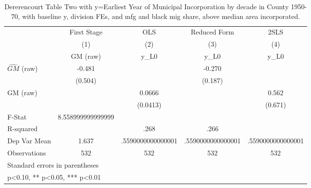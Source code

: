\begin{table}[htbp]\centering
\def\sym#1{\ifmmode^{#1}\else\(^{#1}\)\fi}
\caption{Dererencourt Table Two with y=Earliest Year of Municipal Incorporation by decade in County 1950-70, with baseline y, division FEs, and mfg and black mig share, above median area incorporated.}
\begin{tabular}{l*{4}{c}}
\toprule
                    & First Stage   &         OLS   &Reduced Form   &        2SLS   \\
                    &\multicolumn{1}{c}{(1)}&\multicolumn{1}{c}{(2)}&\multicolumn{1}{c}{(3)}&\multicolumn{1}{c}{(4)}\\
                    &\multicolumn{1}{c}{GM  (raw)}&\multicolumn{1}{c}{y\_L0}&\multicolumn{1}{c}{y\_L0}&\multicolumn{1}{c}{y\_L0}\\
\midrule
$\hat{GM}$ (raw)    &      -0.481   &               &      -0.270   &               \\
                    &     (0.504)   &               &     (0.187)   &               \\
\addlinespace
GM  (raw)           &               &      0.0666   &               &       0.562   \\
                    &               &    (0.0413)   &               &     (0.671)   \\
\midrule
F-Stat              &8.558999999999999   &               &               &               \\
R-squared           &               &        .268   &        .266   &               \\
Dep Var Mean        &       1.637   &.5590000000000001   &.5590000000000001   &.5590000000000001   \\
Observations        &         532   &         532   &         532   &         532   \\
\bottomrule
\multicolumn{5}{l}{\footnotesize Standard errors in parentheses}\\
\multicolumn{5}{l}{\footnotesize * p<0.10, ** p<0.05, *** p<0.01}\\
\end{tabular}
\end{table}
